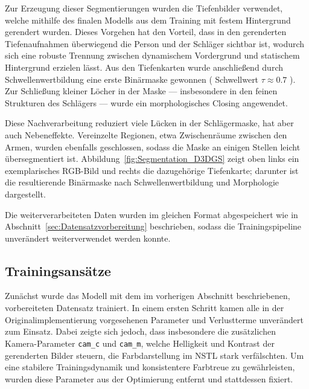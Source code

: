 Zur Erzeugung dieser Segmentierungen wurden die Tiefenbilder verwendet, welche mithilfe des finalen Modells aus dem Training mit festem Hintergrund gerendert wurden. 
Dieses Vorgehen hat den Vorteil, dass in den gerenderten Tiefenaufnahmen überwiegend die Person und der Schläger sichtbar ist, wodurch sich eine robuste Trennung zwischen dynamischem Vordergrund und statischem Hintergrund erzielen lässt. 
Aus den Tiefenkarten wurde anschließend durch Schwellenwertbildung eine erste Binärmaske gewonnen ( Schwellwert $\tau \approx 0.7$ ). 
Zur Schließung kleiner Löcher in der Maske — insbesondere in den feinen Strukturen des Schlägers — wurde ein morphologisches Closing angewendet.

Diese Nachverarbeitung reduziert viele Lücken in der Schlägermaske, hat aber auch Nebeneffekte.
Vereinzelte Regionen, etwa Zwischenräume zwischen den Armen, wurden ebenfalls geschlossen, sodass die Maske an einigen Stellen leicht übersegmentiert ist. 
Abbildung~\ref{fig:Segmentation_D3DGS} zeigt oben links ein exemplarisches RGB-Bild und rechts die dazugehörige Tiefenkarte; darunter ist die resultierende Binärmaske nach Schwellenwertbildung und Morphologie dargestellt. 

Die weiterverarbeiteten Daten wurden im gleichen Format abgespeichert wie in Abschnitt~\ref{sec:Datensatzvorbereitung} beschrieben, sodass die Trainingspipeline unverändert weiterverwendet werden konnte.



\subsection{Trainingsansätze}

Zunächst wurde das Modell mit dem im vorherigen Abschnitt beschriebenen, vorbereiteten Datensatz trainiert. 
In einem ersten Schritt kamen alle in der Originalimplementierung vorgesehenen Parameter und Verlustterme unverändert zum Einsatz. 
Dabei zeigte sich jedoch, dass insbesondere die zusätzlichen Kamera-Parameter \texttt{cam\_c} und \texttt{cam\_m}, welche Helligkeit und Kontrast der gerenderten Bilder steuern, die Farbdarstellung im NSTL stark verfälschten. 
Um eine stabilere Trainingsdynamik und konsistentere Farbtreue zu gewährleisten, wurden diese Parameter aus der Optimierung entfernt und stattdessen fixiert.  

